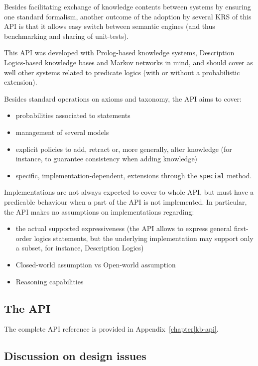 Besides facilitating exchange of knowledge contents between systems by ensuring
one standard formalism, another outcome of the adoption by several KRS of this
API is that it allows easy switch between semantic engines (and thus
benchmarking and sharing of unit-tests).

This API was developed with Prolog-based knowledge systems, Description
Logics-based knowledge bases and Markov networks in mind, and should cover as
well other systems related to predicate logics (with or without a probabilistic
extension).

Besides standard operations on axioms and taxonomy, the API aims to cover:

\begin{itemize}
    \item  probabilities associated to statements
    \item  management of several models
    \item  explicit policies to add, retract or, more generally, alter 
    knowledge (for instance, to guarantee consistency when adding knowledge)
    \item  specific, implementation-dependent, extensions through the
    \texttt{special} method.
\end{itemize}

Implementations are not always expected to cover to whole API, but must have a
predicable behaviour when a part of the API is not implemented. In particular,
the API makes no assumptions on implementations regarding:

\begin{itemize}
    \item  the actual supported expressiveness (the API allows to express
    general first-order logics statements, but the underlying implementation
    may support only a subset, for instance, Description Logics)
    \item  Closed-world assumption vs Open-world assumption
    \item  Reasoning capabilities
\end{itemize}

\subsection{The API}

The complete API reference is provided in Appendix~\ref{chapter|kb-api}.


\subsection{Discussion on design issues}


